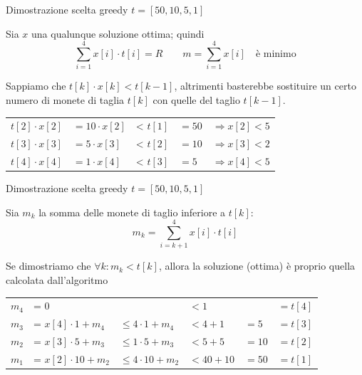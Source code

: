 \begin{frame}{Dimostrazione scelta greedy $t = [50,10,5,1]$}

\vspace{-9pt}
\BIL
\item Sia $x$ una qualunque soluzione ottima; quindi
\[
	\sum_{i=1}^4 x[i] \cdot t[i] = R \qquad m = \sum_{i=1}^4 x[i] \quad \textrm{è minimo}
\]

\item Sappiamo che $t[k] \cdot x[k] < t[k-1]$, altrimenti basterebbe sostituire un certo numero di monete di taglia $t[k]$ con quelle del taglio $t[k-1]$.

\bigskip
\begin{tabular}{lllll}
    $t[2] \cdot x[2]$ & $= 10 \cdot x[2]$ &< $t[1]$ & $= 50$ & $\Rightarrow x[2] < 5$\\
    $t[3] \cdot x[3]$ & $= 5 \cdot x[3]$ &< $t[2]$ & $= 10$ & $\Rightarrow x[3] < 2$\\
    $t[4] \cdot x[4]$ & $= 1 \cdot x[4]$ &< $t[3]$ & $= 5$ & $\Rightarrow x[4] < 5$\\
\end{tabular}
\EIL

\end{frame}

\begin{frame}{Dimostrazione scelta greedy $t = [50,10,5,1]$}

\vspace{-9pt}
\BIL
\item Sia $m_k$ la somma delle monete di taglio inferiore a $t[k]$:
\[
  m_k = \sum_{i=k+1}^4 x[i] \cdot  t[i]
\]

\item 
Se dimostriamo che $\forall k: m_k < t[k]$, allora la soluzione (ottima)
è proprio quella calcolata dall'algoritmo

\bigskip
\begin{tabular}{llllll}
$m_4$ &= $0$                   &              & $< 1$       &       & $= t[4]$ \\
$m_3$ &= $x[4] \cdot 1  + m_4$ & $\leq 4 \cdot 1 + m_4$  & $< 4 + 1$   & $= 5$ & $= t[3]$ \\
$m_2$ &= $x[3] \cdot 5  + m_3$ & $\leq 1 \cdot 5 + m_3$  & $< 5 + 5$   & $=10$ & $= t[2]$ \\
$m_1$ &= $x[2] \cdot 10 + m_2$ & $\leq 4 \cdot 10 + m_2$ & $< 40 + 10$ & $=50$ & $= t[1]$ 
\end{tabular}
\EIL

\end{frame}

